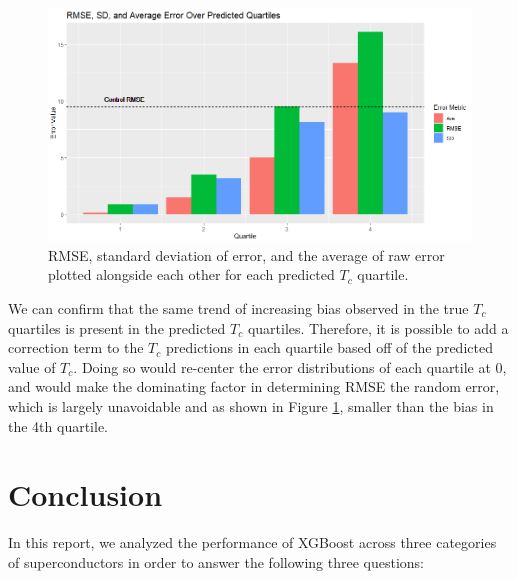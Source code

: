 \documentclass[oneside,12pt]{amsart}
\begin{document}
\begin{figure}
    \centering
    \includegraphics[width = \linewidth]{Pred_Q_Ave_brplt.png}
    \caption{RMSE, standard deviation of error, and the average of raw error plotted alongside each other for each predicted $T_c$ quartile.}
    \label{fig:Pred_Q_Ave_brplt}
\end{figure}

We can confirm that the same trend of increasing bias observed in the true $T_c$ quartiles is present in the predicted $T_c$ quartiles. Therefore, it is possible to add a correction term to the $T_c$ predictions in each quartile based off of the predicted value of $T_c$. Doing so would re-center the error distributions of each quartile at 0, and would make the dominating factor in determining RMSE the random error, which is largely unavoidable and as shown in Figure \ref{fig:Pred_Q_Ave_brplt}, smaller than the bias in the 4th quartile.

\section{Conclusion}
In this report, we analyzed the performance of XGBoost across three categories of superconductors in order to answer the following three questions:
\end{document}
